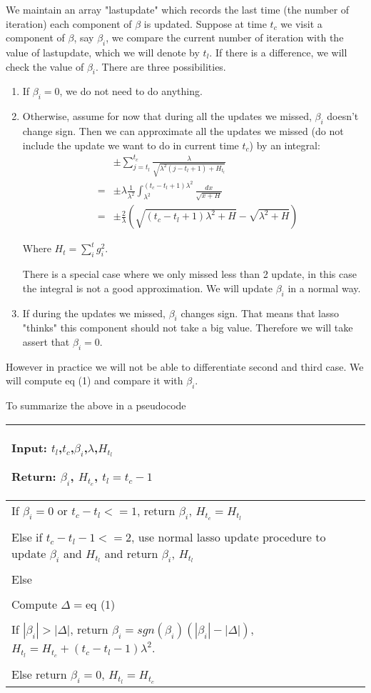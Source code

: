 \documentclass{article}
\begin{document}
We maintain an array "lastupdate" which records the last time (the number of iteration) each component of $\beta$ is updated. Suppose at time $t_c$ we visit a component of $\beta$, say $\beta_i$, we compare the current number of iteration with the value of lastupdate, which we will denote by $t_l$. If there is a difference, we will check the value of $\beta_i$. There are three possibilities.

\begin{enumerate}
\item
If $\beta_i=0$, we do not need to do anything. 
\item
Otherwise, assume for now that during all the updates we missed, $\beta_i$ doesn't change sign. Then we can approximate all the updates we missed (do not include the update we want to do in current time $t_c$) by an integral:
\begin{eqnarray}
&&\pm\sum_{j=t_l}^{t_c}\frac{\lambda}{\sqrt{\lambda^2(j-t_l+1)+H_{t_l}}}\nonumber\\
&=&\pm\lambda\frac{1}{\lambda^2}\int_{\lambda^2}^{(t_c-t_l+1)\lambda^2}\frac{dx}{\sqrt{x+H}}\nonumber\\
&=&\pm\frac{2}{\lambda}(\sqrt{(t_c-t_l+1)\lambda^2+H}-\sqrt{\lambda^2+H})
\end{eqnarray}

Where $H_t=\sum_i^{t}g_i^2$.

There is a special case where we only missed less than 2 update, in this case the integral is not a good approximation. We will update $\beta_i$ in a normal way.

\item
If during the updates we missed, $\beta_i$ changes sign. That means that lasso "thinks" this component should not take a big value. Therefore we will take assert that $\beta_i=0$. 
\end{enumerate}
However in practice we will not be able to differentiate second and third case. We will compute eq (1) and compare it with $\beta_i$.

To summarize the above in a pseudocode

\begin{tabular}{|p{11cm}|}
\hline
Input: $t_l$,$t_c$,$\beta_i$,$\lambda$,$H_{t_l}$

Return: $\beta_i$, $H_{t_c}$, $t_l=t_c-1$\\
\hline
If $\beta_i=0$ or $t_c-t_l<=1$, return $\beta_i$, $H_{t_c}=H_{t_l}$\\
\\
Else if $t_c-t_l-1<=2$, use normal lasso update procedure to update $\beta_i$ and $H_{t_l}$ and return $\beta_i$, $H_{t_l}$\\
\\
Else\\
\\
Compute $\Delta=$eq (1)\\
\\
If $|\beta_i|>|\Delta|$, return $\beta_i=sgn(\beta_i)(|\beta_i|-|\Delta|)$, $H_{t_l}=H_{t_c}+(t_c-t_l-1)\lambda^2$.\\
\\
Else return $\beta_i=0$, $H_{t_l}=H_{t_c}$\\
\hline
\end{tabular}
\end{document}
